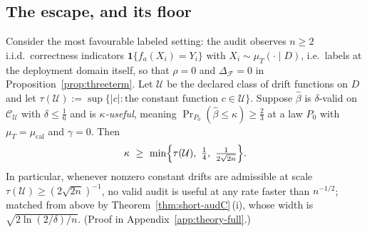 \subsection{The escape, and its floor}

\begin{theorem}\label{thm:lecam}
Consider the most favourable labeled setting: the audit observes $n\ge2$ i.i.d.\ correctness
indicators $\mathbf 1\{f_a(X_i)=Y_i\}$ with $X_i\sim\mu_T(\cdot\mid D)$, i.e.\ labels at the
deployment domain itself, so that $\rho=0$ and $\Delta_{\mathcal F}=0$ in
Proposition~\ref{prop:threeterm}. Let $\mathcal U$ be the declared class of drift functions
on $D$ and let $\tau(\mathcal U):=\sup\{|c|:\text{the constant function }c\in\mathcal U\}$.
Suppose $\widehat\beta$ is $\delta$-valid on $\mathcal C_{\mathcal U}$ with $\delta\le\tfrac16$
and is \emph{$\kappa$-useful}, meaning $\Pr_{P_0}(\widehat\beta\le\kappa)\ge\tfrac23$ at a law
$P_0$ with $\mu_T=\mu_{\mathrm{cal}}$ and $\gamma=0$. Then
\[
\kappa\ \ge\ \min\Bigl\{\tau(\mathcal U),\ \tfrac{1}{4},\ \tfrac{1}{2\sqrt{2n}}\Bigr\}.
\]
In particular, whenever nonzero constant drifts are admissible at scale
$\tau(\mathcal U)\ge(2\sqrt{2n})^{-1}$, no valid audit is useful at any rate faster than
$n^{-1/2}$; matched from above by Theorem~\ref{thm:short-audC}\,(i), whose width is
$\sqrt{2\ln(2/\delta)/n}$. (Proof in Appendix~\ref{app:theory-full}.)
\end{theorem}


